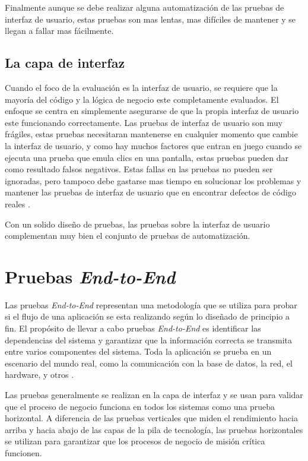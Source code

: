 Finalmente aunque se debe realizar alguna automatización de las pruebas de
interfaz de usuario, estas pruebas son mas lentas, mas difíciles de mantener y
se llegan a fallar mas fácilmente.

\subsection{La capa de interfaz}
Cuando el foco de la evaluación es la interfaz de usuario, se requiere que la
mayoría del código y la lógica de negocio este completamente evaluados. El
enfoque se centra en simplemente asegurarse de que la propia interfaz de
usuario este funcionando correctamente. Las pruebas de interfaz de usuario son
muy frágiles, estas pruebas necesitaran mantenerse en cualquier momento que
cambie la interfaz de usuario, y como hay muchos factores que entran en juego
cuando se ejecuta una prueba que emula clics en una pantalla, estas pruebas
pueden dar como resultado falsos negativos. Estas fallas en las pruebas no
pueden ser ignoradas, pero tampoco debe gastarse mas tiempo en solucionar los
problemas y mantener las pruebas de interfaz de usuario que en encontrar
defectos de código reales \parencite{Francino}.

Con un solido diseño de pruebas, las pruebas sobre la interfaz de usuario
complementan muy bien el conjunto de pruebas de automatización.

\section{Pruebas \emph{End-to-End}}
Las pruebas \emph{End-to-End} representan una metodología que se utiliza para
probar si el flujo de una aplicación se esta realizando según lo diseñado de
principio a fin. El propósito de llevar a cabo pruebas \emph{End-to-End} es
identificar las dependencias del sistema y garantizar que la información
correcta se transmita entre varios componentes del sistema. Toda la aplicación
se prueba en un escenario del mundo real, como la comunicación con la base de
datos, la red, el hardware, y otros \parencite{Sharma}.

Las pruebas generalmente se realizan en la capa de interfaz y se usan para
validar que el proceso de negocio funciona en todos los sistemas como una
prueba horizontal. A diferencia de las pruebas verticales que miden el
rendimiento hacia arriba y hacia abajo de las capas de la pila de tecnología,
las pruebas horizontales se utilizan para garantizar que los procesos de negocio
de misión crítica funcionen.

